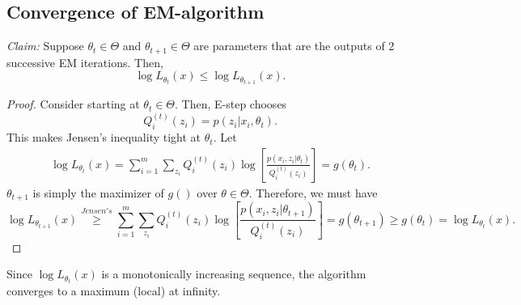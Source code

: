 \documentclass[a4paper,english,12pt]{article}
\begin{document}
\subsection{Convergence of EM-algorithm}
\textit{Claim:} Suppose $\theta_t \in \Theta$ and $\theta_{t+1} \in \Theta $ are parameters that are the outputs of 2 successive EM iterations. Then,$$\log L_{\theta_t}(x)\leq \log L_{\theta_{t+1}}(x).$$
\begin{proof}
Consider starting at $\theta_t \in \Theta $. Then, E-step chooses $$Q_i^{(t)}(z_i) = p(z_i|x_i,\theta_t).$$This makes Jensen's inequality tight at $\theta_t$. Let
\begin{eqnarray*}
\log L_{\theta_t} (x) = \sum\limits_{i=1}^m \sum\limits_{z_i}Q_i^(t)(z_i)\log \left[ \frac{p(x_i,z_i|\theta_t)}{Q_i^(t)(z_i)} \right] = g(\theta_t).
\end{eqnarray*}
$\theta_{t+1}$ is simply the maximizer of $g()$ over $\theta \in \Theta$. Therefore, we must have $$\log L_{\theta_{t+1}} (x) \overset{Jensen's}{\geq} \sum\limits_{i=1}^m \sum\limits_{z_i}Q_i^(t)(z_i)\log \left[ \frac{p(x_i,z_i|\theta_{t+1})}{Q_i^(t)(z_i)} \right] = g(\theta_{t+1}) \geq g(\theta_t) = \log L_{\theta_t} (x).$$
\end{proof}

Since $\log L_{\theta_t} (x)$ is a monotonically increasing sequence, the algorithm converges to a maximum (local) at infinity.
\end{document}

